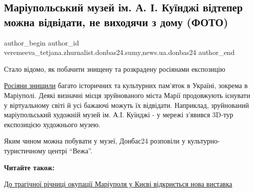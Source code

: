  
 
 
 
 
 
\subsection{Маріупольський музей ім. А. І. Куїнджі відтепер можна відвідати, не виходячи з дому (ФОТО)}
\label{sec:18_05_2023.stz.news.ua.donbas24.1.kuindzhi_muzej_ne_vyhodjachy_z_domu}
 
\ifcmt
 author_begin
   author_id veremeeva_tetjana.zhurnalist.donbas24.sumy,news.ua.donbas24
 author_end
\fi

\begin{qqquote}
Стало відомо, як побачити знищену та розкрадену росіянами експозицію
\end{qqquote}


\href{https://donbas24.news/news/dramteatr-mariupolya-simvol-pamyati-boli-i-tugi-za-zagiblimi-mariupolcyami}{Росіяни знищили} 
багато історичних та культурних пам'яток в Україні, зокрема в
Маріуполі. Деякі визначні місця зруйнованого міста Марії продовжують існувати у
віртуальному світі й усі бажаючі можуть їх відвідати. Наприклад, зруйнований
маріупольський художній музей ім. А.І. Куїнджі - у мережі з'явився 3D-тур
експозицією художнього музею.

Яким чином можна побувати у музеї, Донбас24 розповіли у культурно-туристичному
центрі \enquote{Вежа}.

\textbf{Читайте також:}

\href{https://donbas24.news/news/do-tragicnoyi-ricnici-okupaciyi-v-mariupoli-u-kijevi-vidkrijetsya-nova-vistavka}{До
трагічної річниці окупації Маріуполя у Києві відкриється нова виставка}

